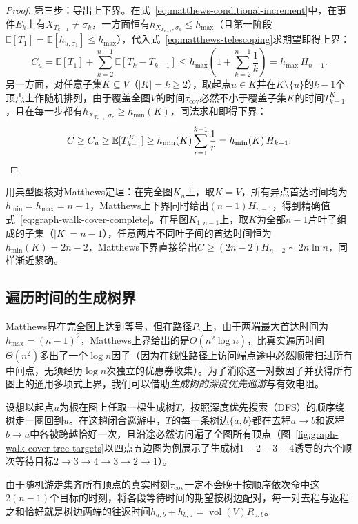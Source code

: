 \begin{proof}
第三步：导出上下界。在式~\eqref{eq:matthews-conditional-increment}中，在事件$E_k$上有$X_{T_{k-1}}\neq\sigma_k$，一方面恒有$h_{X_{T_{k-1}},\sigma_k}\leq h_{\max}$（且第一阶段$\mathbb E[T_1]=\mathbb E[h_{u,\sigma_1}]\leq h_{\max}$），代入式~\eqref{eq:matthews-telescoping}求期望即得上界：
\[
  C_u = \mathbb E[T_1] + \sum_{k=2}^{n-1}\mathbb E[T_k - T_{k-1}] \leq h_{\max}\left(1 + \sum_{k=2}^{n-1}\frac{1}{k}\right) = h_{\max}\,H_{n-1}.
\]
另一方面，对任意子集$K\subseteq V$（$|K|=k\geq 2$），取起点$u\in K$并在$K\setminus\{u\}$的$k-1$个顶点上作随机排列，由于覆盖全图$V$的时间$\tau_{\mathrm{cov}}$必然不小于覆盖子集$K$的时间$T_{k-1}^K$，且在每一步都有$h_{X_{T_{r-1}},\sigma_r}\geq h_{\min}(K)$，同法求和即得下界：
\[
  C \geq C_u \geq \mathbb E[T_{k-1}^K] \geq h_{\min}(K)\sum_{r=1}^{k-1}\frac{1}{r} = h_{\min}(K)\,H_{k-1}.\qedhere
\]
\end{proof}

用典型图核对Matthews定理：在完全图$K_n$上，取$K=V$，所有异点首达时间均为$h_{\min}=h_{\max}=n-1$，Matthews上下界同时给出$(n-1)H_{n-1}$，得到精确值式~\eqref{eq:graph-walk-cover-complete}。在星图$K_{1,n-1}$上，取$K$为全部$n-1$片叶子组成的子集（$|K|=n-1$），任意两片不同叶子间的首达时间恒为$h_{\min}(K)=2n-2$，Matthews下界直接给出$C\geq(2n-2)H_{n-2}\sim 2n\ln n$，同样渐近紧确。

\subsection{遍历时间的生成树界}
\label{sec:graph-walk-cover-tree-bound}

Matthews界在完全图上达到等号，但在路径$P_n$上，由于两端最大首达时间为$h_{\max}=(n-1)^2$，Matthews上界给出的是$O(n^2\log n)$，比真实遍历时间$\Theta(n^2)$多出了一个$\log n$因子（因为在线性路径上访问端点途中必然顺带扫过所有中间点，无须经历$\log n$次独立的优惠券收集）。为了消除这一对数因子并获得所有图上的通用多项式上界，我们可以借助\emph{生成树的深度优先巡游}与有效电阻。

设想以起点$u$为根在图上任取一棵生成树$T$，按照深度优先搜索（DFS）的顺序绕树走一圈回到$u$。在这趟闭合巡游中，$T$的每一条树边$\{a,b\}$都在去程$a\to b$和返程$b\to a$中各被跨越恰好一次，且沿途必然访问遍了全图所有顶点（图~\ref{fig:graph-walk-cover-tree-targets}以四点五边图为例展示了生成树$1\!-\!2\!-\!3\!-\!4$诱导的六个顺次等待目标$2\to 3\to 4\to 3\to 2\to 1$）。

由于随机游走集齐所有顶点的真实时刻$\tau_{\mathrm{cov}}$一定不会晚于按顺序依次命中这$2(n-1)$个目标的时刻，将各段等待时间的期望按树边配对，每一对去程与返程之和恰好就是树边两端的往返时间$h_{a,b}+h_{b,a}=\operatorname{vol}(V)R_{a,b}$。


